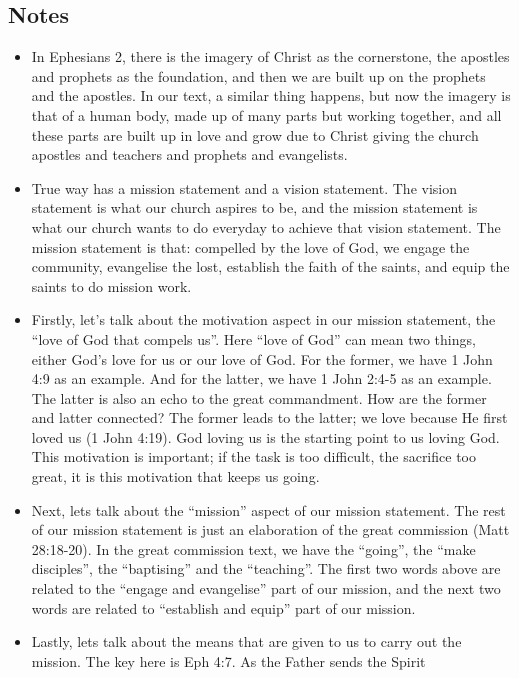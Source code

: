 \subsection*{Notes}
\begin{itemize}
  \item{In Ephesians 2, there is the imagery of Christ as the cornerstone,
  the apostles and prophets as the foundation, and then we are built up on
  the prophets and the apostles.  In our text, a similar thing happens, but
  now the imagery is that of a human body, made up of many parts but working
  together, and all these parts are built up in love and grow due to Christ
  giving the church apostles and teachers and prophets and evangelists.}
  \item{True way has a mission statement and a vision statement. The vision statement is what our church aspires to be, and the mission statement is what our church wants to do everyday to achieve that vision statement. The mission statement is that: compelled by the love of God, we engage the community, evangelise the lost, establish the faith of the saints, and equip the saints to do mission work.}
  \item{Firstly, let’s talk about the motivation aspect in our mission
  statement, the “love of God that compels us”.  Here “love of God” can mean
  two things, either God’s love for us or our love of God.  For the former,
  we have 1 John 4:9 as an example.  And for the latter, we have 1 John 2:4-5
  as an example.  The latter is also an echo to the great commandment.  How
  are the former and latter connected?  The former leads to the latter; we
  love because He first loved us (1 John 4:19).  God loving us is the
  starting point to us loving God.  This motivation is important; if the task
  is too difficult, the sacrifice too great, it is this motivation that keeps
  us going.}
  \item{Next, lets talk about the “mission” aspect of our mission statement.
  The rest of our mission statement is just an elaboration of the great
  commission (Matt 28:18-20).  In the great commission text, we have the
  “going”, the “make disciples”, the “baptising” and the “teaching”.  The
  first two words above are related to the “engage and evangelise” part of
  our mission, and the next two words are related to “establish and equip”
  part of our mission.}
  \item{Lastly, lets talk about the means that are given to us to carry out
  the mission.  The key here is Eph 4:7.  As the Father sends the Spirit
}
\end{itemize}
